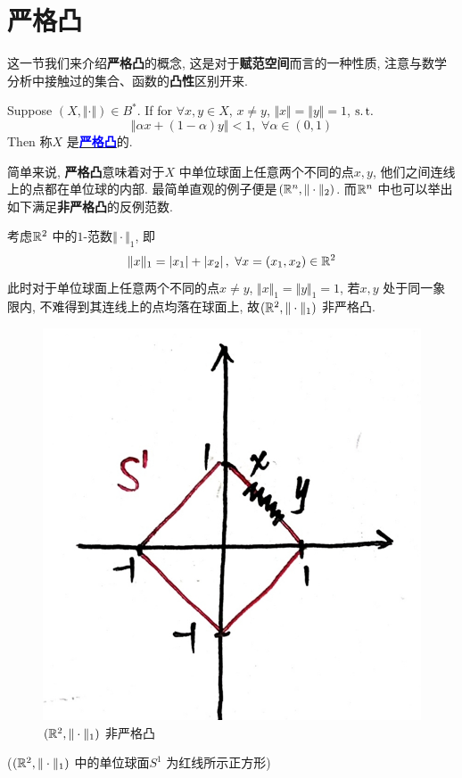 \section{严格凸}
	这一节我们来介绍\textbf{严格凸}的概念, 这是对于\textbf{赋范空间}而言的一种性质, 注意与数学分析中接触过的集合、函数的\textbf{凸性}区别开来. 
	
	\vspace{1em}
	
	\begin{defn}\label{def 2.3.1}
		Suppose $(X , \Vert \cdot \Vert) \in B^*$. If for $\forall x , y \in X$, $x \neq y$, $\Vert x \Vert = \Vert y \Vert = 1$, $\operatorname{s.t.}$
		\[ \Vert \alpha x + (1 - \alpha) y \Vert < 1 , \,\, \forall \alpha \in (0 , 1) \]
		Then 称$X$ 是\underline{\textcolor{blue}{\textbf{严格凸}}}的. 
		
		\vspace{2em}
		
		\begin{rmk}
			简单来说, \textbf{严格凸}意味着对于$X$ 中单位球面上任意两个不同的点$x , y$, 他们之间连线上的点都在单位球的内部. 最简单直观的例子便是$(\mathbb{R}^n , \Vert \cdot \Vert_2 )$. 而$\mathbb{R}^n$ 中也可以举出如下满足\textbf{非严格凸}的反例范数. 
			\begin{example}\label{ex 2.3.1}
				考虑$\mathbb{R}^2$ 中的$1$-范数$\Vert \cdot \Vert_1$, 即
				\[ \Vert x \Vert_1 = \left| x_1 \right| + \left| x_2 \right| , \,\, \forall x = (x_1 , x_2) \in \mathbb{R}^2 \]
				此时对于单位球面上任意两个不同的点$x \neq y$, $\Vert x \Vert_1 = \Vert y \Vert_1 = 1$, 若$x , y$ 处于同一象限内, 不难得到其连线上的点均落在球面上, 故$(\mathbb{R}^2 , \Vert \cdot \Vert_1)$ 非严格凸. 
				
				\begin{figure}[thbp!]
					\centering
					\includegraphics[width=0.3\linewidth]{figure/2.3-1}
					\caption{$(\mathbb{R}^2 , \Vert \cdot \Vert_1)$ 非严格凸}
					\label{pic : 2.3-1} %
				\end{figure}
				
				\begin{center}
					($(\mathbb{R}^2 , \Vert \cdot \Vert_1)$ 中的单位球面$S^1$ 为红线所示正方形)
				\end{center}
			\end{example}
		\end{rmk}
	\end{defn}

